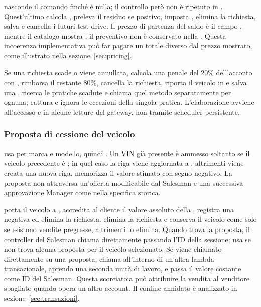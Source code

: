  nasconde il comando finché  è nulla; il controllo però non è ripetuto in . Quest'ultimo calcola , preleva il residuo se positivo, imposta , elimina la richiesta, salva  e cancella i futuri test drive. Il prezzo di partenza del saldo è il campo , mentre il catalogo mostra ; il preventivo non è conservato nella . Questa incoerenza implementativa può far pagare un totale diverso dal prezzo mostrato, come illustrato nella sezione~\ref{sec:pricing}.

Se una richiesta scade o viene annullata,  calcola una penale del 20\% dell'acconto con , rimborsa il restante 80\%, cancella la richiesta, riporta il veicolo in  e salva una .  ricerca le pratiche scadute e chiama quel metodo separatamente per ognuna; cattura e ignora le eccezioni della singola pratica. L'elaborazione avviene all'accesso e in alcune letture del gateway, non tramite scheduler persistente.

\subsubsection{Proposta di cessione del veicolo}
 usa  per marca e modello, quindi . Un VIN già presente è ammesso soltanto se il veicolo precedente è ; in quel caso la riga viene aggiornata a , altrimenti viene creata una nuova riga.  memorizza il valore stimato con segno negativo. La proposta non attraversa un'offerta modificabile dal Salesman e una successiva approvazione Manager come nella specifica storica.

 porta il veicolo a , accredita al cliente il valore assoluto della , registra una  negativa ed elimina la richiesta.  elimina la richiesta e conserva il veicolo come  solo se esistono vendite pregresse, altrimenti lo elimina. Quando trova la proposta, il controller del Salesman chiama direttamente  passando l'ID della sessione; usa  se non trova alcuna proposta per il veicolo selezionato. Se  viene chiamato direttamente su una proposta, chiama  all'interno di un'altra lambda transazionale, aprendo una seconda unità di lavoro, e passa il valore costante  come ID del Salesman. Questa scorciatoia può attribuire la vendita al venditore sbagliato quando opera un altro account. Il confine annidato è analizzato in sezione~\ref{sec:transazioni}.

